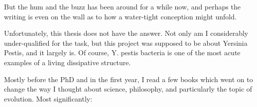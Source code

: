 But the hum and the buzz has been around for a while now,  and perhaps the writing is even on the wall as to how a water-tight conception might unfold.

Unfortunately,  this thesis does not have the answer.  Not only am I considerably under-qualified for the task,  but this project was supposed to be about Yersinia Pestis,  and it largely is.  Of course,  Y.  pestis bacteria is one of the most acute examples of a living dissipative structure.  \par

\vspace{10pt} 


\noindent
 Mostly before the PhD and in the first year,  I read a few books which went on to change the way I thought about science,  philosophy,  and particularly the topic of evolution.  Most significantly: 


